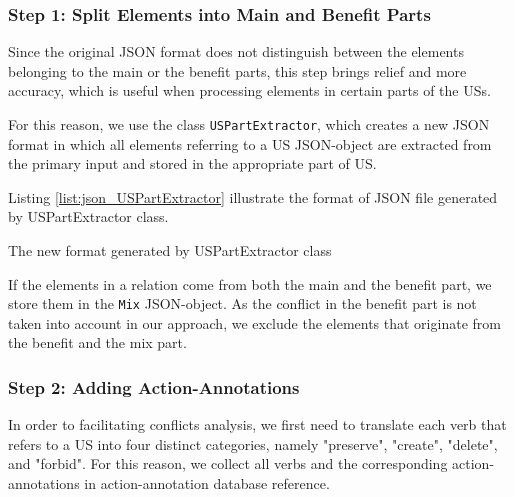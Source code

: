 \subsubsection*{Step 1: Split Elements into Main and Benefit Parts}\label{conflict_design_step_1}
Since the original JSON format does not distinguish between the elements belonging to the main or the benefit parts, this step brings relief and more accuracy, which is useful when processing elements in certain parts of the USs.

For this reason, we use the class \texttt{USPartExtractor}, which creates a new JSON format in which all elements referring to a US JSON-object are extracted from the primary input and stored in the appropriate part of US.

Listing \ref{list:json_USPartExtractor} illustrate the format of JSON file generated by USPartExtractor class.
\newpage
\begin{MyListing}
	\centering
	
	\caption{The new format generated by USPartExtractor class}\label{list:json_USPartExtractor}
\end{MyListing}
If the elements in a relation come from both the main and the benefit part, we store them in the \texttt{Mix} JSON-object. As the conflict in the benefit part is not taken into account in our approach, we exclude the elements that originate from the benefit and the mix part.
\subsubsection*{Step 2: Adding Action-Annotations}
In order to facilitating conflicts analysis, we first need to translate each verb that refers to a US into four distinct categories, namely "preserve", "create", "delete", and "forbid". For this reason, we collect all verbs and the corresponding action-annotations in action-annotation database reference.

